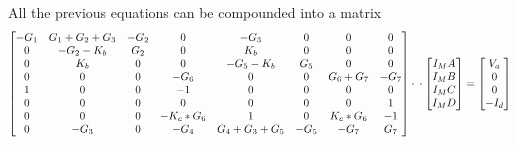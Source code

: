 All the previous equations can be compounded into a matrix
  \begin{equation}\label{eq:matrixeqn2}
\begin{bmatrix}
    -G_1 & G_1+G_2+G_3 & -G_2 & 0 & -G_3 & 0 & 0 & 0\\
    0 & -G_2-K_b & G_2 & 0 & K_b & 0 & 0 & 0\\
    0 & K_b & 0 & 0 & -G_5-K_b & G_5 & 0 & 0\\
    0 & 0 & 0 & -G_6 & 0 & 0 & G_6+G_7 & -G_7\\
    1 & 0 & 0 & -1 & 0 & 0 & 0 & 0\\
    0 & 0 & 0 & 0 & 0 & 0 & 0 & 1\\
    0 & 0 & 0 & -K_c*G_6 & 1 & 0 & K_c*G_6 & -1\\
    0 & -G_3 & 0 & -G_4 & G_4+G_3+G_5 & -G_5 & -G_7 & G_7\\
\end{bmatrix}
\cdot

\\

\cdot
\begin{bmatrix}
I_MA \\
I_MB \\
I_MC \\
I_MD \\
    \end{bmatrix}
=
    \begin{bmatrix}
V_a \\
0 \\
0 \\
-I_d\\
    \end{bmatrix}
  \end{equation}


